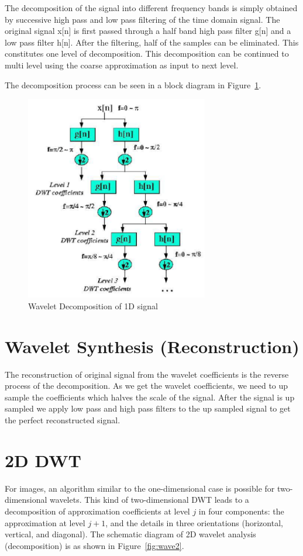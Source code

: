 \documentclass[a4paper,12pt]{article}
\begin{document}
The decomposition of the signal into different frequency bands is simply obtained by successive high pass and low pass filtering of the time domain signal. The original signal x[n] is first passed through a half band high pass filter g[n] and a low pass filter h[n]. After the filtering, half of the samples can be eliminated. This constitutes one level of decomposition. This decomposition can be continued to multi level using the coarse approximation as input to next level.


The decomposition process can be seen in a block diagram in Figure~\ref{fig:wave1}.

\begin{figure}[]
        \centering
        \includegraphics[width=8cm]{diagram.png}
        \caption{Wavelet Decomposition of 1D signal}
		\label{fig:wave1}
\end{figure}


\section{Wavelet Synthesis (Reconstruction)}
The reconstruction of original signal from the wavelet coefficients is the reverse process of the decomposition. As we get the wavelet coefficients, we need to up sample the coefficients which halves the scale of the signal. After the signal is up sampled we apply low pass and high pass filters to the up sampled signal to get the perfect reconstructed signal.


\section{2D DWT}
For images, an algorithm similar to the one-dimensional case is possible for two-dimensional wavelets. This kind of two-dimensional DWT leads to a decomposition of approximation coefficients at level $j$ in four components: the approximation at level $j+1$, and the details in three orientations (horizontal, vertical, and diagonal). The schematic diagram of 2D wavelet analysis (decomposition) is as shown in Figure~\ref{fig:wave2}.
\end{document}
